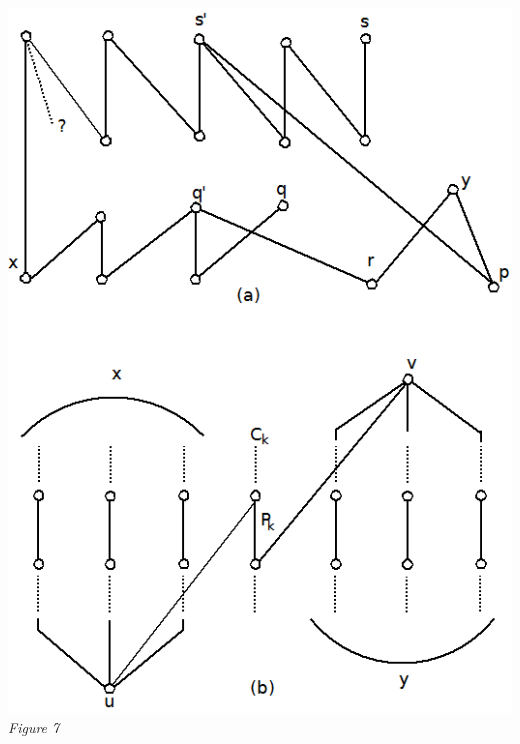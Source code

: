 \documentclass[twoside]{article}
\begin{document}
\begin{center}
\vspace{1cm}
\includegraphics[scale=0.5]{figures/Figure7.png}\\
\textit{Figure 7}\\
\end{center}
\end{document}
